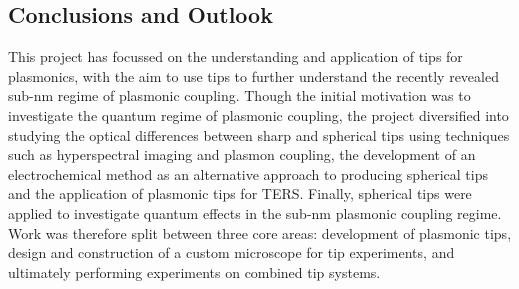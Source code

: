 \documentclass[12pt, a4paper, oneside]{book}
\begin{document}
\begin{singlespace}
\color{white}\chapter{Conclusions and Outlook}
\end{singlespace}


This project has focussed on the understanding and application of tips for plasmonics, with the aim to use tips to further understand the recently revealed sub-nm regime of plasmonic coupling. Though the initial motivation was to investigate the quantum regime of plasmonic coupling, the project diversified into studying the optical differences between sharp and spherical tips using techniques such as hyperspectral imaging and plasmon coupling, the development of an electrochemical method as an alternative approach to producing spherical tips and the application of plasmonic tips for TERS. Finally, spherical tips were applied to investigate quantum effects in the sub-nm plasmonic coupling regime. Work was therefore split between three core areas: development of plasmonic tips, design and construction of a custom microscope for tip experiments, and ultimately performing experiments on combined tip systems.
\end{document}
